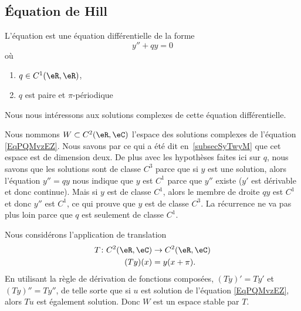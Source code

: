 \subsection{Équation de Hill}
\label{SubSecDWwVVPa}

L'équation  est une équation différentielle de la forme
\begin{equation}    \label{EqPQMvzEZ}
	y''+qy=0
\end{equation}
où
\begin{enumerate}
	\item
	      \( q\in C^1(\eR,\eR)\),
	\item
	      \( q\) est paire et \( \pi\)-périodique
\end{enumerate}
Nous nous intéressons aux solutions complexes de cette équation différentielle.

Nous nommons \( W\subset C^2(\eR,\eC)\) l'espace des solutions complexes de l'équation \eqref{EqPQMvzEZ}. Nous savons par ce qui a été dit en~\ref{subsecSyTwyM} que cet espace est de dimension deux. De plus avec les hypothèses faites ici sur \( q\), nous savons que les solutions sont de classe \( C^3\) parce que si \( y\) est une solution, alors l'équation \( y''=qy\) nous indique que \( y\) est \( C^1\) parce que \( y''\) existe (\( y'\) est dérivable et donc continue). Mais si \( y\) est de classe \( C^1\), alors le membre de droite \( qy\) est \( C^1\) et donc \( y''\) est \( C^1\), ce qui prouve que \( y\) est de classe \( C^3\). La récurrence ne va pas plus loin parce que \( q\) est seulement de classe \( C^1\).

Nous considérons l'application de translation
\begin{equation}
	\begin{aligned}
		T\colon C^2(\eR,\eC) & \to C^2(\eR,\eC) \\
		(Ty)(x)              & =y(x+\pi).
	\end{aligned}
\end{equation}
En utilisant la règle de dérivation de fonctions composées, \( (Ty)'=Ty'\) et \( (Ty)''=Ty''\), de telle sorte que si \( u\) est solution de l'équation \eqref{EqPQMvzEZ}, alors \( Tu\) est également solution. Donc \( W\) est un espace stable par \( T\).

